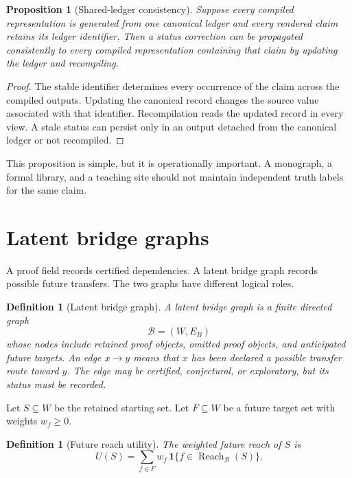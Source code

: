 \documentclass[11pt,oneside]{article}
\theoremstyle{komorebiplain}
\newtheorem{proposition}[theorem]{Proposition}
\theoremstyle{komorebidefinition}
\newtheorem{definition}[theorem]{Definition}
\theoremstyle{komorebiremark}
\newcommand{\Bcal}{\mathcal B}
\newcommand{\Reach}{\operatorname{Reach}}
\begin{document}
\begin{proposition}[Shared-ledger consistency]
\label{res:12:2}
Suppose every compiled representation is generated from one canonical ledger and every rendered claim retains its ledger identifier. Then a status correction can be propagated consistently to every compiled representation containing that claim by updating the ledger and recompiling.
\end{proposition}

\begin{proof}
The stable identifier determines every occurrence of the claim across the compiled outputs. Updating the canonical record changes the source value associated with that identifier. Recompilation reads the updated record in every view. A stale status can persist only in an output detached from the canonical ledger or not recompiled.
\end{proof}

This proposition is simple, but it is operationally important. A monograph, a formal library, and a teaching site should not maintain independent truth labels for the same claim.


\section{Latent bridge graphs}
\label{sec:old13}

A proof field records certified dependencies. A latent bridge graph records possible future transfers. The two graphs have different logical roles.

\begin{definition}[Latent bridge graph]
\label{res:13:1}
A latent bridge graph is a finite directed graph
\[
\Bcal=(W,E_B)
\]
whose nodes include retained proof objects, omitted proof objects, and anticipated future targets. An edge $x\to y$ means that $x$ has been declared a possible transfer route toward $y$. The edge may be certified, conjectural, or exploratory, but its status must be recorded.
\end{definition}

Let $S\subseteq W$ be the retained starting set. Let $F\subseteq W$ be a future target set with weights $w_f\ge0$.

\begin{definition}[Future reach utility]
\label{res:13:2}
The weighted future reach of $S$ is
\[
U(S)=\sum_{f\in F}w_f\,
\mathbf 1\{f\in\Reach_{\Bcal}(S)\}.
\]
\end{definition}
\end{document}
